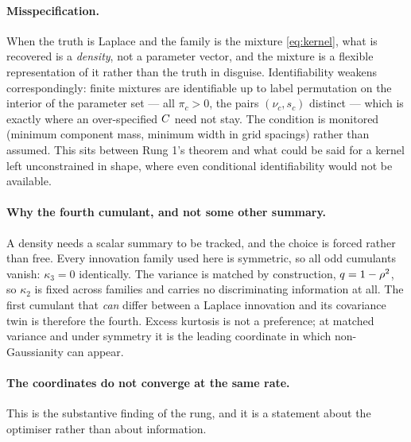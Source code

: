 \documentclass{article}
\theoremstyle{definition}
\theoremstyle{plain}
\begin{document}
\paragraph{Misspecification.} When the truth is Laplace and the family is the mixture
\eqref{eq:kernel}, what is recovered is a \emph{density}, not a parameter vector, and the mixture
is a flexible representation of it rather than the truth in disguise. Identifiability weakens
correspondingly: finite mixtures are identifiable up to label permutation on the interior of the
parameter set --- all $\pi_c>0$, the pairs $(\nu_c,s_c)$ distinct \citep{teicher1963,yakowitz1968}
--- which is exactly where an over-specified $C$ need not stay. The condition is monitored
(minimum component mass, minimum width in grid spacings) rather than assumed. This sits between
Rung 1's theorem and what could be said for a kernel left unconstrained in shape, where even
conditional identifiability would not be available.

\paragraph{Why the fourth cumulant, and not some other summary.} A density needs a scalar summary
to be tracked, and the choice is forced rather than free. Every innovation family used here is
symmetric, so all odd cumulants vanish: $\kappa_3=0$ identically. The variance is matched by
construction, $q=1-\rho^2$, so $\kappa_2$ is fixed across families and carries no
discriminating information at all. The first cumulant that \emph{can} differ between a Laplace
innovation and its covariance twin is therefore the fourth. Excess kurtosis is not a preference;
at matched variance and under symmetry it is the leading coordinate in which non-Gaussianity can
appear.

\paragraph{The coordinates do not converge at the same rate.} This is the substantive finding of
the rung, and it is a statement about the optimiser rather than about information.
\end{document}
